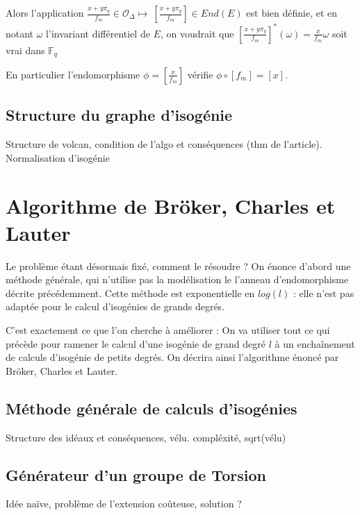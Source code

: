\documentclass{article}
\newcommand{\OR}[0]{\mathcal{O}}
\newcommand{\F}[0]{\mathbb{F}}
\begin{document}
Alors l'application $\frac{x + y\pi_{q}}{f_{m}} \in \OR_{\Delta}\mapsto\ \left[ \frac{x + y\pi_{q}}{f_{m}}\right] \in End(E) $ est bien définie, et en notant $\omega$ l'invariant différentiel de $E$, on voudrait que
$\left[ \frac{x + y\pi_{q}}{f_{m}}\right] ^{*} (\omega) = \frac{x}{f_{m}}\omega$ soit vrai dans $\F_{q}$

En particulier l'endomorphisme $\phi = \left[ \frac{x}{f_{m}}\right] $ vérifie $\phi\circ\left[ f_{m}\right] =\left[ x\right] $.


\subsection{Structure du graphe d'isogénie}

Structure de volcan, condition de l'algo et conséquences (thm de l'article). Normalisation d'isogénie
















\section{Algorithme de Bröker, Charles et Lauter}

Le problème étant désormais fixé, comment le résoudre ? On énonce d'abord une méthode générale, qui n'utilise pas la modélisation le l'anneau d’endomorphisme décrite précédemment. Cette méthode est exponentielle en $log(l)$ : elle n'est pas adaptée pour le calcul d'isogénies de grands degrés.

C'est exactement ce que l'on cherche à améliorer : On va utiliser tout ce qui précède pour ramener le calcul d'une isogénie de grand degré $l$ à un enchaînement de calculs d'isogénie de petits degrés. On décrira ainsi l’algorithme énoncé par Bröker, Charles et Lauter. 

\subsection{Méthode générale de calculs d'isogénies}
Structure des idéaux et conséquences, vélu. compléxité, sqrt(vélu)

\subsection{Générateur d'un groupe de Torsion}
Idée naïve, problème de l'extension coûteuse, solution ?
\end{document}
